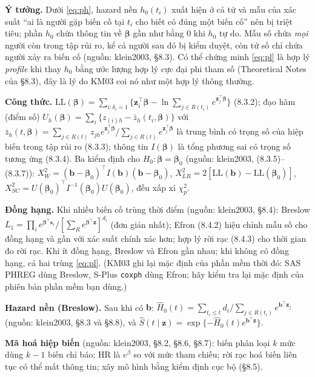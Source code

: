 \documentclass[11pt,a4paper,notitlepage]{report}
\newcommand{\tr}{^{\top}}
\providecommand{\nguon}[1]{(nguồn: #1)}
\begin{document}
\begin{bosung}
\textbf{Ý tưởng.} Dưới \eqref{eq:ph}, hazard nền $h_0(t_i)$ xuất hiện ở cả tử và mẫu của xác suất ``ai là người gặp biến cố tại $t_i$ cho biết có đúng một biến cố'' nên bị triệt tiêu;
phần $h_0$ chứa thông tin về $\bm\beta$ gần như bằng 0 khi $h_0$ tự do. Mẫu số chứa \emph{mọi} người còn trong tập rủi ro, kể cả người sau đó bị kiểm duyệt, còn tử số chỉ chứa người xảy ra biến cố
\nguon{klein2003, \S8.3}. Có thể chứng minh \eqref{eq:pl} là hợp lý \emph{profile} khi thay $h_0$ bằng ước lượng hợp lý cực đại phi tham số (Theoretical Notes của \S8.3), đây là lý do KM03 coi nó như một hợp lý thông thường.

\textbf{Công thức.} $\mathrm{LL}(\bm\beta)=\sum_{i:\delta_i=1}\{\bm z_i\tr\bm\beta-\ln\sum_{j\in R(t_i)}e^{\bm z_j\tr\bm\beta}\}$ (8.3.2); đạo hàm (điểm số) $U_h(\bm\beta)=\sum_i\{z_{(i)h}-\bar z_h(t_i,\bm\beta)\}$ với
$\bar z_h(t,\bm\beta)=\sum_{j\in R(t)}z_{jh}e^{\bm z_j\tr\bm\beta}/\sum_{j\in R(t)}e^{\bm z_j\tr\bm\beta}$ là trung bình có trọng số của hiệp biến trong tập rủi ro (8.3.3); thông tin $I(\bm\beta)$ là tổng phương sai có trọng số tương ứng (8.3.4).
Ba kiểm định cho $H_0:\bm\beta=\bm\beta_0$ \nguon{klein2003, (8.3.5)--(8.3.7)}:
$X^2_W=(\bm b-\bm\beta_0)\tr I(\bm b)(\bm b-\bm\beta_0)$, $X^2_{LR}=2[\mathrm{LL}(\bm b)-\mathrm{LL}(\bm\beta_0)]$, $X^2_{SC}=U(\bm\beta_0)\tr I^{-1}(\bm\beta_0)U(\bm\beta_0)$, đều xấp xỉ $\chi^2_p$.

\textbf{Đồng hạng.} Khi nhiều biến cố trùng thời điểm \nguon{klein2003, \S8.4}: Breslow $L_1=\prod_i e^{\bm\beta\tr\bm s_i}/[\sum_{R}e^{\bm\beta\tr\bm z}]^{d_i}$ (đơn giản nhất); Efron (8.4.2) hiệu chỉnh mẫu số cho đồng hạng và gần với xác suất chính xác hơn;
hợp lý rời rạc (8.4.3) cho thời gian đo rời rạc. Khi ít đồng hạng, Breslow và Efron gần nhau; khi không có đồng hạng, cả hai trùng \eqref{eq:pl}. (KM03 ghi lại mặc định của phần mềm thời đó: SAS PHREG dùng Breslow, S-Plus \texttt{coxph} dùng Efron; hãy kiểm tra lại mặc định của phiên bản phần mềm bạn dùng.)

\textbf{Hazard nền (Breslow).} Sau khi có $\bm b$: $\hat H_0(t)=\sum_{t_i\le t}d_i/\sum_{j\in R(t_i)}e^{\bm b\tr\bm z_j}$ \nguon{klein2003, \S8.3 và \S8.8}, và $\hat S(t\mid\bm z)=\exp\{-\hat H_0(t)e^{\bm b\tr\bm z}\}$.

\textbf{Mã hoá hiệp biến} \nguon{klein2003, \S8.2, \S8.6, \S8.7}: biến phân loại $k$ mức dùng $k-1$ biến chỉ báo; HR là $e^{\beta}$ so với mức tham chiếu; rời rạc hoá biến liên tục có thể mất thông tin; xây mô hình bằng kiểm định cục bộ (\S8.5).
\end{bosung}
\end{document}
